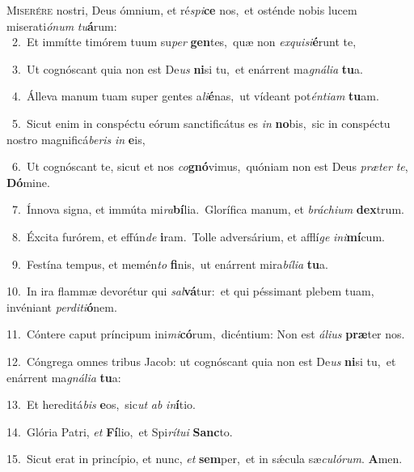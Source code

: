 \lettrine{\initial\textcolor{\initialcolor}{M}}{iserére} nostri, Deus ómnium, et ré\-\textit{spi}\-\textbf{ce} nos,~\star et osténde nobis lucem miserati\-\textit{ó}\-\textit{num} \textit{tu}\-\textbf{á}rum:\\
{\numbfont\textcolor{\numbcolor}{~2.}}~Et immítte timórem tuum su\textit{per} \textbf{gen}\-tes,~\star quæ non \textit{ex}\-\textit{qui}\textit{si}\textbf{é}runt te,\par
{\numbfont\textcolor{\numbcolor}{~3.}}~Ut cognóscant quia non est De\textit{us} \textbf{ni}\-si tu,~\star et enárrent ma\-\textit{gná}\-\textit{li}\textit{a} \textbf{tu}\-a.\par
{\numbfont\textcolor{\numbcolor}{~4.}}~Álleva manum tuam super gentes a\-\textit{li}\-\textbf{é}nas,~\star ut vídeant pot\-\textit{én}\-\textit{ti}\textit{am} \textbf{tu}\-am.\par
{\numbfont\textcolor{\numbcolor}{~5.}}~Sicut enim in conspéctu eórum sanctificátus es \textit{in} \textbf{no}\-bis,~\star sic in conspéctu nostro magnificá\-\textit{be}\-\textit{ris} \textit{in} \textbf{e}\-is,\par
{\numbfont\textcolor{\numbcolor}{~6.}}~Ut cognóscant te, sicut et nos \textit{co}\-\textbf{gnó}vimus,~\star quóniam non est Deus \textit{præ}\-\textit{ter} \textit{te}\-, \textbf{Dó}\-mine.\par
{\numbfont\textcolor{\numbcolor}{~7.}}~Ínnova signa, et immúta mi\-\textit{ra}\-\textbf{bí}lia.~\star Glorífica manum, et \textit{brá}\-\textit{chi}\textit{um} \textbf{dex}\-trum.\par
{\numbfont\textcolor{\numbcolor}{~8.}}~Éxcita furórem, et effún\textit{de} \textbf{i}\-ram.~\star Tolle adversárium, et afflí\textit{ge} \textit{in}\-\textit{i}\textbf{mí}cum.\par
{\numbfont\textcolor{\numbcolor}{~9.}}~Festína tempus, et memén\textit{to} \textbf{fi}\-nis,~\star ut enárrent mira\-\textit{bí}\-\textit{li}\textit{a} \textbf{tu}\-a.\par
{\numbfont\textcolor{\numbcolor}{10.}}~In ira flammæ devorétur qui \textit{sal}\-\textbf{vá}tur:~\star et qui péssimant plebem tuam, invéniant \textit{per}\-\textit{di}\textit{ti}\textbf{ó}nem.\par
{\numbfont\textcolor{\numbcolor}{11.}}~Cóntere caput príncipum ini\-\textit{mi}\-\textbf{có}rum,~\star dicéntium: Non est \textit{á}\-\textit{li}\textit{us} \textbf{præ}\-ter nos.\par
{\numbfont\textcolor{\numbcolor}{12.}}~Cóngrega omnes tribus Jacob: ut cognóscant quia non est De\textit{us} \textbf{ni}\-si tu,~\star et enárrent ma\-\textit{gná}\-\textit{li}\textit{a} \textbf{tu}\-a:\par
{\numbfont\textcolor{\numbcolor}{13.}}~Et hereditá\textit{bis} \textbf{e}\-os,~\star sic\textit{ut} \textit{ab} \textit{in}\-\textbf{í}tio.\par
{\numbfont\textcolor{\numbcolor}{14.}}~Glória Patri, \textit{et} \textbf{Fí}\-lio,~\star et Spi\-\textit{rí}\-\textit{tu}\textit{i} \textbf{Sanc}\-to.\par
{\numbfont\textcolor{\numbcolor}{15.}}~Sicut erat in princípio, et nunc, \textit{et} \textbf{sem}\-per,~\star et in sǽcula sæ\-\textit{cu}\-\textit{ló}\textit{rum}. \textbf{A}\-men.\par

